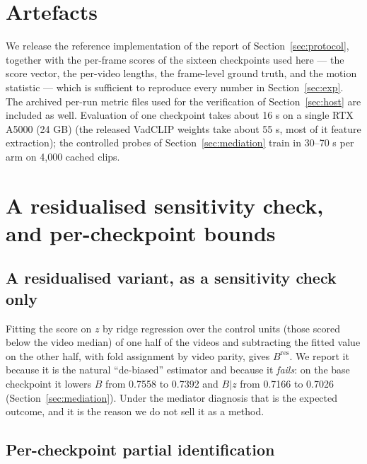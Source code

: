 \documentclass[number,preprint,12pt]{elsarticle}
\begin{document}
\section{Artefacts}\label{sec:appB}

We release the reference implementation of the report of
Section~\ref{sec:protocol}, together with the per-frame scores of the sixteen
checkpoints used here --- the score vector, the per-video lengths, the
frame-level ground truth, and the motion statistic --- which is sufficient to
reproduce every number in Section~\ref{sec:exp}. The archived per-run metric
files used for the verification of Section~\ref{sec:host} are included as well.
Evaluation of one checkpoint takes about 16 s on a single RTX A5000 (24 GB)
(the released VadCLIP weights take about 55 s, most of it feature extraction);
the controlled probes of Section~\ref{sec:mediation} train in 30--70 s per arm
on 4,000 cached clips.

\section{A residualised sensitivity check, and per-checkpoint bounds}\label{sec:appC}

\subsection{A residualised variant, as a sensitivity check only}\label{sec:resid}

Fitting the score on \(z\) by ridge regression over the control units (those scored
below the video median) of one half of
the videos and subtracting the fitted value on the other half, with fold
assignment by video parity, gives \(B^{\mathrm{res}}\). We report it because it is the
natural ``de-biased'' estimator and because it \emph{fails}: on the base checkpoint it
lowers \(B\) from 0.7558 to 0.7392 and \(B|z\) from 0.7166 to 0.7026 (Section~\ref{sec:mediation}). Under
the mediator diagnosis that is the expected outcome, and it is the reason we do
not sell it as a method.

\subsection{Per-checkpoint partial identification}\label{sec:appc-bounds}
\end{document}
